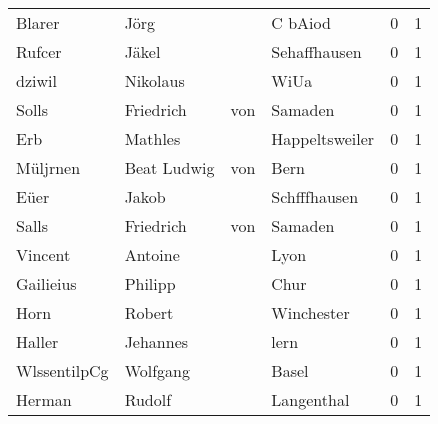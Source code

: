 \begin{center}
\begin{tiny}
\begin{longtabu}{llllrr}
                   Blarer &                               Jörg &             &                                     C bAiod &          0 &         1 \\
                   Rufcer &                              Jäkel &             &                                Sehaffhausen &          0 &         1 \\
                   dziwil &                           Nikolaus &             &                                        WiUa &          0 &         1 \\
                    Solls &                          Friedrich &         von &                                     Samaden &          0 &         1 \\
                      Erb &                            Mathles &             &                              Happeltsweiler &          0 &         1 \\
                 Müljrnen &                        Beat Ludwig &         von &                                        Bern &          0 &         1 \\
                     Eüer &                              Jakob &             &                                Schfffhausen &          0 &         1 \\
                    Salls &                          Friedrich &         von &                                     Samaden &          0 &         1 \\
                  Vincent &                            Antoine &             &                                        Lyon &          0 &         1 \\
                Gailieius &                            Philipp &             &                                        Chur &          0 &         1 \\
                     Horn &                             Robert &             &                                  Winchester &          0 &         1 \\
                   Haller &                           Jehannes &             &                                        lern &          0 &         1 \\
             WlssentilpCg &                           Wolfgang &             &                                       Basel &          0 &         1 \\
                   Herman &                             Rudolf &             &                                  Langenthal &          0 &         1 \\

\end{longtabu}
\end{tiny}
\end{center}
